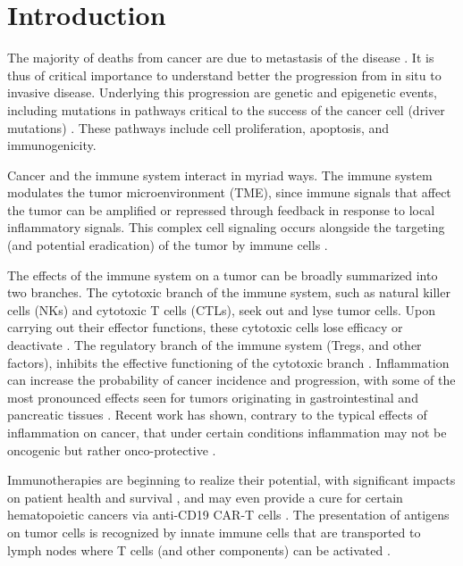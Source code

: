 \documentclass[11pt]{article}
\begin{document}
\section{Introduction}
The majority of deaths from cancer are due to metastasis of the disease \cite{dillekaas201990}. It is thus of critical importance to understand better the progression from in situ to invasive disease. Underlying this progression are genetic and epigenetic events, including mutations in pathways critical to the success of the cancer cell (driver mutations) \cite{ryan2016hallmarks}. These pathways include cell proliferation, apoptosis, and immunogenicity.
\par 
Cancer and the immune system interact in myriad ways. The immune system modulates the tumor microenvironment (TME), since immune signals that affect the tumor can be amplified or repressed through feedback in response to local inflammatory signals. This complex cell signaling occurs alongside the targeting (and potential eradication) of the tumor by immune cells \cite{de2006paradoxical}.
\par 
The effects of the immune system on a tumor can be broadly summarized into two branches. The cytotoxic branch of the immune system, such as natural killer cells (NKs) and cytotoxic T cells (CTLs), seek out and lyse tumor cells. Upon carrying out their effector functions, these cytotoxic cells lose efficacy or deactivate \cite{finn12_immunooncology-1}. The regulatory branch of the immune system (Tregs, and other factors), inhibits the effective functioning of the cytotoxic branch \cite{ruffell2010lymphocytes}.
Inflammation can increase the probability of cancer incidence and progression, with some of the most pronounced effects seen for tumors originating in gastrointestinal and pancreatic tissues \cite{hu10_inflammationinduced, balkwill01_inflammation}.
Recent work has shown, contrary to the typical effects of inflammation on cancer, that under certain conditions inflammation may not be oncogenic but rather onco-protective \cite{guo17_multiscale}.
\par
Immunotherapies are beginning to realize their potential, with significant impacts on patient health and survival \cite{pardoll2012blockade,restifo2012adoptive}, and may even provide a cure for certain hematopoietic cancers via anti-CD19 CAR-T cells \cite{safeandpotent}. The presentation of antigens on tumor cells is recognized by innate immune cells that are transported to lymph nodes where T cells (and other components) can be activated \cite{schreiber11_cancer}.
\end{document}
